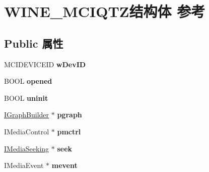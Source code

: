 \hypertarget{struct_w_i_n_e___m_c_i_q_t_z}{}\section{W\+I\+N\+E\+\_\+\+M\+C\+I\+Q\+T\+Z结构体 参考}
\label{struct_w_i_n_e___m_c_i_q_t_z}
\subsection*{Public 属性}
\begin{DoxyCompactItemize}
\item 
\mbox{\label{struct_w_i_n_e___m_c_i_q_t_z_a5d455631038428882493d2e129dd332f}} 
M\+C\+I\+D\+E\+V\+I\+C\+E\+ID {\bfseries w\+Dev\+ID}
\item 
\mbox{\label{struct_w_i_n_e___m_c_i_q_t_z_ad9fbb507eb86bd782f8096f1ec9acd09}} 
B\+O\+OL {\bfseries opened}
\item 
\mbox{\label{struct_w_i_n_e___m_c_i_q_t_z_a00f62c69171882a26c2bc13eb8ca11a3}} 
B\+O\+OL {\bfseries uninit}
\item 
\mbox{\label{struct_w_i_n_e___m_c_i_q_t_z_a8b724ea001e2dfa7927ca292fd5a585b}} 
\hyperlink{interface_i_graph_builder}{I\+Graph\+Builder} $\ast$ {\bfseries pgraph}
\item 
\mbox{\label{struct_w_i_n_e___m_c_i_q_t_z_ac10e770173e01dc346fd5de8ac847058}} 
I\+Media\+Control $\ast$ {\bfseries pmctrl}
\item 
\mbox{\label{struct_w_i_n_e___m_c_i_q_t_z_a40a81a00cd1064b947a8de46bd5b7f7d}} 
\hyperlink{interface_i_media_seeking}{I\+Media\+Seeking} $\ast$ {\bfseries seek}
\item 
\mbox{\label{struct_w_i_n_e___m_c_i_q_t_z_a3bb59c11421dec4003eb2bab7e216791}} 
I\+Media\+Event $\ast$ {\bfseries mevent}
\item 
\mbox{\label{struct_w_i_n_e___m_c_i_q_t_z_a7984b9b9675d1f35e355f0ba8a7c39f1}} 

\end{DoxyCompactItemize}
